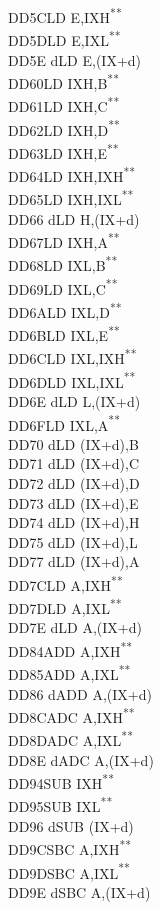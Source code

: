 \documentclass[12pt,twoside,openright,a4paper]{book}
\newcommand{\UNDOC}{\textnormal{\textsuperscript{**}}}
\begin{document}
\begin{multicols}{3}
{\begin{tabbing}
	DD5C\>LD E,IXH\UNDOC\\
	DD5D\>LD E,IXL\UNDOC\\
	DD5E d\>LD E,(IX+d)\\
	DD60\>LD IXH,B\UNDOC\\
	DD61\>LD IXH,C\UNDOC\\
	DD62\>LD IXH,D\UNDOC\\
	DD63\>LD IXH,E\UNDOC\\
	DD64\>LD IXH,IXH\UNDOC\\
	DD65\>LD IXH,IXL\UNDOC\\
	DD66 d\>LD H,(IX+d)\\
	DD67\>LD IXH,A\UNDOC\\
	DD68\>LD IXL,B\UNDOC\\
	DD69\>LD IXL,C\UNDOC\\
	DD6A\>LD IXL,D\UNDOC\\
	DD6B\>LD IXL,E\UNDOC\\
	DD6C\>LD IXL,IXH\UNDOC\\
	DD6D\>LD IXL,IXL\UNDOC\\
	DD6E d\>LD L,(IX+d)\\
	DD6F\>LD IXL,A\UNDOC\\
	DD70 d\>LD (IX+d),B\\
	DD71 d\>LD (IX+d),C\\
	DD72 d\>LD (IX+d),D\\
	DD73 d\>LD (IX+d),E\\
	DD74 d\>LD (IX+d),H\\
	DD75 d\>LD (IX+d),L\\
	DD77 d\>LD (IX+d),A\\
	DD7C\>LD A,IXH\UNDOC\\
	DD7D\>LD A,IXL\UNDOC\\
	DD7E d\>LD A,(IX+d)\\
	DD84\>ADD A,IXH\UNDOC\\
	DD85\>ADD A,IXL\UNDOC\\
	DD86 d\>ADD A,(IX+d)\\
	DD8C\>ADC A,IXH\UNDOC\\
	DD8D\>ADC A,IXL\UNDOC\\
	DD8E d\>ADC A,(IX+d)\\
	DD94\>SUB IXH\UNDOC\\
	DD95\>SUB IXL\UNDOC\\
	DD96 d\>SUB (IX+d)\\
	DD9C\>SBC A,IXH\UNDOC\\
	DD9D\>SBC A,IXL\UNDOC\\
	DD9E d\>SBC A,(IX+d)\\

\end{tabbing}}
\end{multicols}
\end{document}
